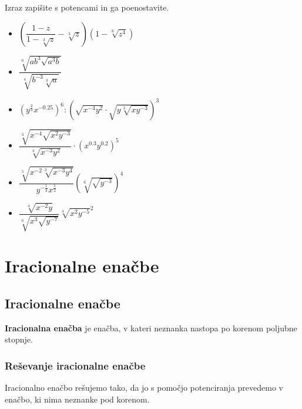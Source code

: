         
            \begin{naloga}
                Izraz zapišite s potencami in ga poenostavite.
                \begin{multicols}{2}
                    \begin{itemize}
                        \item $\displaystyle \left(\dfrac{1-z}{1-\sqrt[3]{z}}-\sqrt[3]{z}\right)\left(1-\sqrt[6]{z^4}\right)$ 
                        \item $\displaystyle \dfrac{\sqrt[6]{ab^3\sqrt{a^3b}}}{\sqrt[4]{b^{-3}\sqrt[3]{a}}}$ 
                        \item $\displaystyle \left(y^\frac{2}{3}x^{-0.25}\right)^6 :\left(\sqrt{x^{-4}y^2}\cdot\sqrt{y\sqrt[3]{xy^{-3}}}\right)^3 $ 
                        \item $\displaystyle \dfrac{\sqrt[3]{x^{-4}\sqrt{x^2y^{-3}}}}{\sqrt[4]{x^{-3}y^2}}\cdot\left(x^{0.3}y^{0.2}\right)^5 $ 
                        \item $\displaystyle \dfrac{\sqrt[5]{x^{-2}\sqrt[3]{x^{-3}y^4}}}{y^{-\frac{1}{3}}x^\frac{1}{2}}\left(\sqrt[6]{\sqrt{y^{-3}}}\right)^4 $ 
                        \item $\displaystyle \dfrac{\sqrt[4]{x^{-2}y}}{\sqrt[6]{x^3\sqrt{y^{-7}}}}\sqrt[4]{x^2y^{-5}}^2 $ 
                    \end{itemize}
                \end{multicols}
            \end{naloga}
        





            \newpage

    \section{Iracionalne enačbe}

        
            \subsection{Iracionalne enačbe}

                \textbf{Iracionalna enačba} je enačba, v kateri neznanka nastopa po korenom poljubne stopnje.
            

            \subsubsection*{Reševanje iracionalne enačbe}
                Iracionalno enačbo rešujemo tako, da jo s pomočjo potenciranja prevedemo v enačbo, ki nima neznanke pod korenom.

